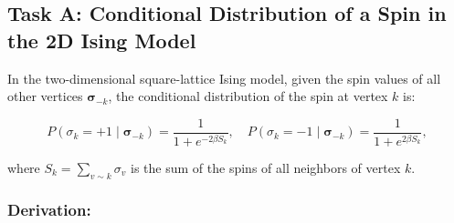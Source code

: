 \documentclass[11pt]{article}
\begin{document}
    \subsection{Task A: Conditional Distribution of a Spin in the 2D Ising
Model}\label{task-a-conditional-distribution-of-a-spin-in-the-2d-ising-model}

In the two-dimensional square-lattice Ising model, given the spin values
of all other vertices \(\pmb{\sigma}_{-k}\), the conditional
distribution of the spin at vertex \(k\) is:

\[
P(\sigma_k = +1 \mid \pmb{\sigma}_{-k}) = \frac{1}{1 + e^{-2\beta S_k}}, \quad P(\sigma_k = -1 \mid \pmb{\sigma}_{-k}) = \frac{1}{1 + e^{2\beta S_k}},
\]

where \(S_k = \sum_{v \sim k} \sigma_v\) is the sum of the spins of all
neighbors of vertex \(k\).

\subsubsection{Derivation:}\label{derivation}
\end{document}
